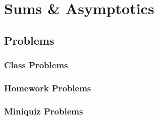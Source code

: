 \chapter{Sums \& Asymptotics}
\coursecopyright


\section{Problems}

\subsection{Class Problems}
%
%
\clearpage

\subsection{Homework Problems}
%
\clearpage

\subsection{Miniquiz Problems}
\clearpage

\endinput